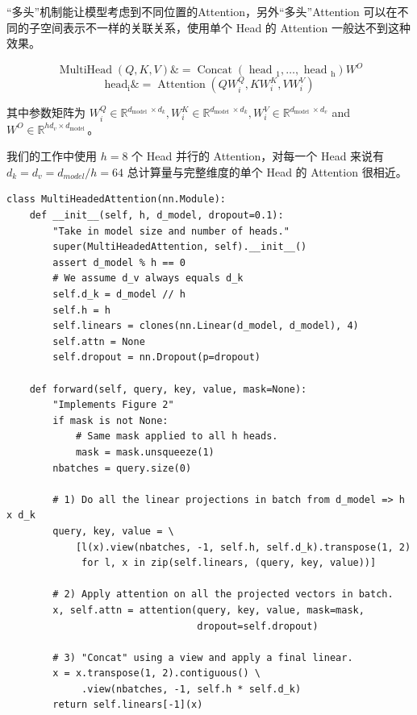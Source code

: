 “多头”机制能让模型考虑到不同位置的Attention，另外“多头”Attention 可以在不同的子空间表示不一样的关联关系，使用单个 Head 的 Attention 一般达不到这种效果。

$$\operatorname{MultiHead}(Q, K, V) \&=\operatorname{Concat}\left(\text { head }_{1}, \ldots, \text { head }_{\mathrm{h}}\right) W^{O} $$
\begin{equation}
\text {head}_{\mathrm{i}} \&=\operatorname{Attention}\left(Q W_{i}^{Q}, K W_{i}^{K}, V W_{i}^{V}\right)
\end{equation}

其中参数矩阵为 $W_{i}^{Q} \in \mathbb{R}^{d_{\text {model }} \times d_{k}}, W_{i}^{K} \in \mathbb{R}^{d_{\text {model }} \times d_{k}}, W_{i}^{V} \in \mathbb{R}^{d_{\text {model }} \times d_{v}}$ and $W^{O} \in \mathbb{R}^{h d_{v} \times d_{\text {model }}}$。

我们的工作中使用 $h = 8$ 个 Head 并行的 Attention，对每一个 Head 来说有 $d_{k} = d_{v} = d_{model}/h = 64$ 总计算量与完整维度的单个 Head 的 Attention 很相近。

\begin{Verbatim}
class MultiHeadedAttention(nn.Module):
    def __init__(self, h, d_model, dropout=0.1):
        "Take in model size and number of heads."
        super(MultiHeadedAttention, self).__init__()
        assert d_model % h == 0
        # We assume d_v always equals d_k
        self.d_k = d_model // h
        self.h = h
        self.linears = clones(nn.Linear(d_model, d_model), 4)
        self.attn = None
        self.dropout = nn.Dropout(p=dropout)
        
    def forward(self, query, key, value, mask=None):
        "Implements Figure 2"
        if mask is not None:
            # Same mask applied to all h heads.
            mask = mask.unsqueeze(1)
        nbatches = query.size(0)
        
        # 1) Do all the linear projections in batch from d_model => h x d_k 
        query, key, value = \
            [l(x).view(nbatches, -1, self.h, self.d_k).transpose(1, 2)
             for l, x in zip(self.linears, (query, key, value))]
        
        # 2) Apply attention on all the projected vectors in batch. 
        x, self.attn = attention(query, key, value, mask=mask, 
                                 dropout=self.dropout)
        
        # 3) "Concat" using a view and apply a final linear. 
        x = x.transpose(1, 2).contiguous() \
             .view(nbatches, -1, self.h * self.d_k)
        return self.linears[-1](x)
\end{Verbatim}

